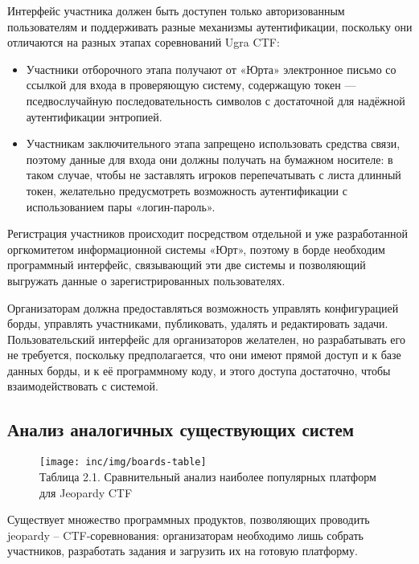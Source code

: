Интерфейс участника должен быть доступен только авторизованным пользователям и поддерживать разные механизмы аутентификации, поскольку они отличаются на разных этапах соревнований Ugra CTF:

\begin{itemize}
\item
  Участники отборочного этапа получают от «Юрта» электронное письмо со ссылкой для входа в проверяющую систему, содержащую токен — пседвослучайную последовательность символов с достаточной для надёжной аутентификации энтропией.
\item
  Участникам заключительного этапа запрещено использовать средства связи, поэтому данные для входа они должны получать на бумажном носителе: в таком случае, чтобы не заставлять игроков перепечатывать с листа длинный токен, желательно предусмотреть возможность аутентификации с использованием пары «логин-пароль».
\end{itemize}


Регистрация участников происходит посредством отдельной и уже разработанной оргкомитетом информационной системы «Юрт», поэтому в борде необходим программный интерфейс, связывающий эти две системы и позволяющий выгружать данные о зарегистрированных пользователях.

Организаторам должна предоставляться возможность управлять конфигурацией борды, управлять участниками, публиковать, удалять и редактировать задачи. Пользовательский интерфейс для организаторов желателен, но разрабатывать его не требуется, поскольку предполагается, что они имеют прямой доступ и к базе данных борды, и к её программному коду, и этого доступа достаточно, чтобы взаимодействовать с системой.

\subsection{Анализ аналогичных существующих систем}

\begin{figure}
  \centering
  \texttt{[image: inc/img/boards-table]}\\
  Таблица 2.1. Сравнительный анализ наиболее популярных платформ для Jeopardy CTF
  \label{fig:jeopardy}
\end{figure}

Существует множество программных продуктов, позволяющих проводить jeopardy -- CTF-соревнования: организаторам необходимо лишь собрать участников, разработать задания и загрузить их на готовую платформу.

